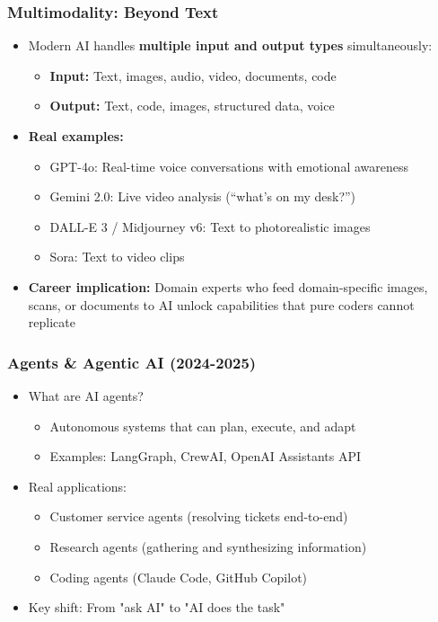 \begin{frame}[fragile]\frametitle{Multimodality: Beyond Text}
\begin{itemize}
\item Modern AI handles \textbf{multiple input and output types} simultaneously:
    \begin{itemize}
    \item \textbf{Input:} Text, images, audio, video, documents, code
    \item \textbf{Output:} Text, code, images, structured data, voice
    \end{itemize}
\item \textbf{Real examples:}
    \begin{itemize}
    \item GPT-4o: Real-time voice conversations with emotional awareness
    \item Gemini 2.0: Live video analysis (``what's on my desk?'')
    \item DALL-E 3 / Midjourney v6: Text to photorealistic images
    \item Sora: Text to video clips
    \end{itemize}
\item \textbf{Career implication:} Domain experts who feed domain-specific images, scans, or documents to AI unlock capabilities that pure coders cannot replicate
\end{itemize}
\end{frame}

\begin{frame}[fragile]\frametitle{Agents \& Agentic AI (2024-2025)}

\begin{itemize}
\item What are AI agents?
	\begin{itemize}
	\item Autonomous systems that can plan, execute, and adapt
	\item Examples: LangGraph, CrewAI, OpenAI Assistants API
	\end{itemize}
\item Real applications:
	\begin{itemize}
	\item Customer service agents (resolving tickets end-to-end)
	\item Research agents (gathering and synthesizing information)
	\item Coding agents (Claude Code, GitHub Copilot)
	\end{itemize}
\item 	Key shift: From "ask AI" to "AI does the task"
\end{itemize}
\end{frame}


